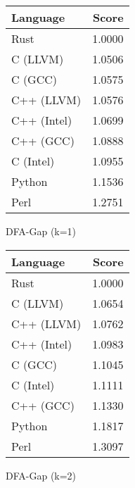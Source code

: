 \begin{subtable}{0.33\textwidth}
    \centering
    \begin{tabular}{|l|r|}
        \hline
        Language & Score \\
        \hline
        Rust & 1.0000 \\
        C (LLVM) & 1.0506 \\
        C (GCC) & 1.0575 \\
        C++ (LLVM) & 1.0576 \\
        C++ (Intel) & 1.0699 \\
        C++ (GCC) & 1.0888 \\
        C (Intel) & 1.0955 \\
        Python & 1.1536 \\
        Perl & 1.2751 \\
        \hline
    \end{tabular}
    \caption{DFA-Gap (k=1)}
    \label{table:energy:dfa_gap(1)}
\end{subtable}%
\begin{subtable}{0.33\textwidth}
    \centering
    \begin{tabular}{|l|r|}
        \hline
        Language & Score \\
        \hline
        Rust & 1.0000 \\
        C (LLVM) & 1.0654 \\
        C++ (LLVM) & 1.0762 \\
        C++ (Intel) & 1.0983 \\
        C (GCC) & 1.1045 \\
        C (Intel) & 1.1111 \\
        C++ (GCC) & 1.1330 \\
        Python & 1.1817 \\
        Perl & 1.3097 \\
        \hline
    \end{tabular}
    \caption{DFA-Gap (k=2)}
    \label{table:energy:dfa_gap(2)}
\end{subtable}
